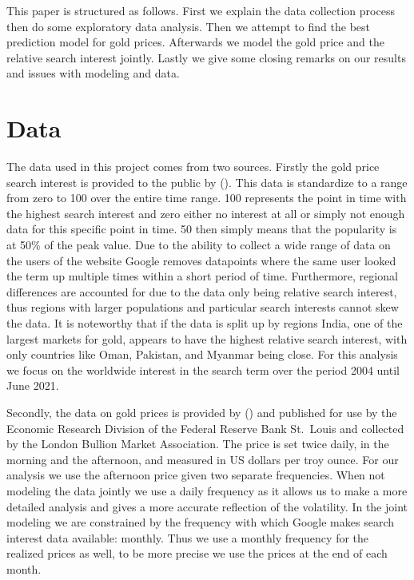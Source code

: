 \documentclass[a4paper]{article}
\theoremstyle{definition}
\begin{document}
This paper is structured as follows. First we explain the data collection process then do some exploratory data analysis. Then we attempt to find the best prediction model for gold prices. Afterwards we model the gold price and the relative search interest jointly. Lastly we give some closing remarks on our results and issues with modeling and data.
\section{Data}
The data used in this project comes from two sources. Firstly the gold price search interest is provided to the public by \citeauthor{Google.2021} (\citeyear{Google.2021}). This data is standardize to a range from zero to 100 over the entire time range. 100 represents the point in time with the highest search interest and zero either no interest at all or simply not enough data for this specific point in time. 50 then simply means that the popularity is at 50\% of the peak value. Due to the ability to collect a wide range of data on the users of the website Google removes datapoints where the same user looked the term up multiple times within a short period of time. Furthermore, regional differences  are accounted for due to the data only being relative search interest, thus regions with larger populations and particular search interests cannot skew the data. It is noteworthy that if the data is split up by regions India, one of the largest markets for gold, appears to have the highest relative search interest, with only countries like Oman, Pakistan, and Myanmar being close. For this analysis we focus on the worldwide interest in the search term  over the period 2004 until June 2021.

Secondly, the data on gold prices is provided by \citeauthor{ICEBenchmarkAdministrationLimited.} (\citeyear{ICEBenchmarkAdministrationLimited.}) and published for use by the Economic Research Division of the Federal Reserve Bank St.\ Louis and collected by the London Bullion Market Association. The price is set twice daily, in the morning and the afternoon, and measured in US dollars per troy ounce. For our analysis we use the afternoon price given two separate frequencies. When not modeling the data jointly we use a daily frequency as it allows us to make a more detailed analysis and gives a more accurate reflection of the volatility. In the joint modeling we are constrained by the frequency with which Google makes search interest data available: monthly. Thus we use a monthly frequency for the realized prices as well, to be more precise we use the prices at the end of each month. 
\newpage
\end{document}
